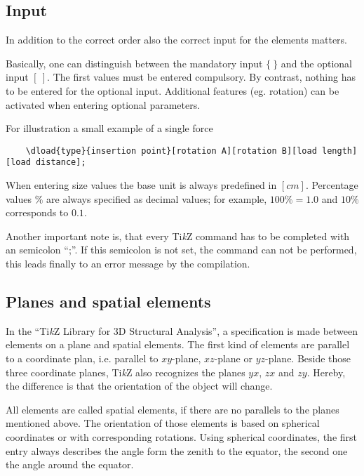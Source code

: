 \documentclass[%
  a4paper,
  BCOR20mm,
  pointlessnumbers,
  twoside,
  halfparskip,
  openright,
]{scrreprt}
\newcommand{\tikzsym}{Ti\emph{k}Z }
\begin{document}
\subsection{Input}
\label{sec:Eingabe}

In addition to the correct order also the correct input for the elements matters.

Basically, one can distinguish between the mandatory input $\{~\}$ and the optional input $[~]$. The first values must be entered compulsory. By contrast, nothing has to be entered for the optional input. Additional features (eg. rotation) can be activated when entering optional parameters.

For illustration a small example of a single force

\begin{lstlisting}
	\dload{type}{insertion point}[rotation A][rotation B][load length][load distance];
\end{lstlisting} 

When entering size values the base unit is always predefined in $[cm]$.  Percentage values $\%$ are always specified as decimal values; for example, $100\% = 1.0 $ and $ 10 \% $ corresponds to $ 0.1 $.

Another important note is, that every \tikzsym command has to be completed with an semicolon ``;''. If this semicolon is not set, the command can not be performed, this leads finally to an error message by the compilation.

\subsection{Planes and spatial elements}
\label{sec:EbenenUndRaumlicheElemente}

In the ``\tikzsym Library for 3D Structural Analysis'', a specification is made between elements on a plane and spatial elements. The first kind of elements are parallel to a coordinate plan, i.e. parallel to $xy$-plane, $xz$-plane or $yz$-plane. Beside those three coordinate planes, \tikzsym also recognizes the planes $yx$, $zx$ and $zy$. Hereby, the difference is that the orientation of the object will change.

All elements are called spatial elements, if there are no parallels to the planes mentioned above. The orientation of those elements is based on spherical coordinates or with corresponding rotations. Using spherical coordinates, the first entry always describes the angle form the zenith to the equator, the second one the angle around the equator.
\end{document}
